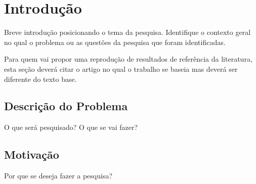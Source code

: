 \documentclass[english]{article}
\begin{document}
\pagestyle{empty} 
\sloppy
{}

\begin{abstract}
O trabalho deverá ser em duas colunas de acordo com o modelo Latex aqui
apresentado (neste caso deverá ser limitado a 6 páginas) ou gerado
via outro editor (no caso de coluna simples limitado a 12 páginas).
Sugestões para as seções
estão  listadas a seguir. \vspace{2cm}
\end{abstract}

\section{Introdução}
\vspace{1cm}
 Breve introdução posicionando  o tema da pesquisa.
Identifique o contexto geral no qual o problema ou as questões da
pesquisa que foram identificadas. \vspace{1cm}



Para quem vai propor uma reprodução de resultados de referência da literatura, esta
seção deverá citar o artigo no qual o trabalho se baseia mas deverá ser diferente
do texto base.

\subsection{Descrição do Problema}
\vspace{1cm} O que será pesquisado? O que se vai fazer?
\subsection{Motivação}
\vspace{1cm} Por que se deseja fazer a pesquisa? \vspace{1cm}
\end{document}
